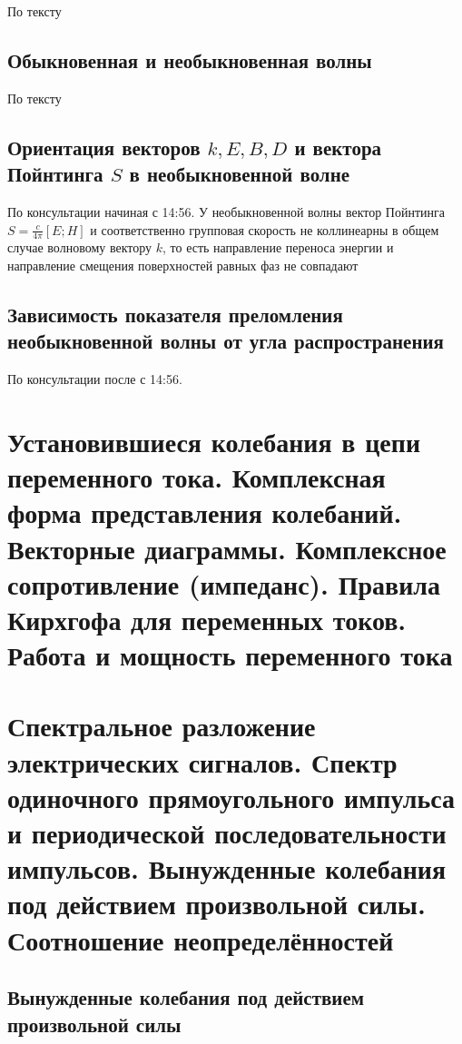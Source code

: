 \documentclass[a4paper, 14pt]{article}
\begin{document}
    По тексту
    
    \subsection{Обыкновенная и необыкновенная волны}
    
    По тексту
    
    \subsection{Ориентация векторов $k, E, B, D$ и вектора Пойнтинга $S$ в необыкновенной волне}
    
    По консультации начиная с 14:56.
    У необыкновенной волны вектор Пойнтинга $S = \frac{c}{4 \pi} [E;H]$ и соответственно групповая скорость не
    коллинеарны в общем случае волновому вектору $k$, то есть направление переноса энергии и направление смещения
    поверхностей равных фаз не совпадают
    
    \subsection{Зависимость показателя преломления необыкновенной волны от угла распространения}
    
    По консультации после с 14:56.
    
    \section{Установившиеся колебания в цепи переменного тока.
    Комплексная форма представления колебаний.
    Векторные диаграммы.
    Комплексное сопротивление (импеданс).
    Правила Кирхгофа для переменных токов.
    Работа и мощность переменного тока}
    
    \section{Спектральное разложение электрических сигналов.
    Спектр одиночного прямоугольного импульса и периодической последовательности импульсов.
    Вынужденные колебания под действием произвольной силы.
    Соотношение неопределённостей}
    
    \subsection{Вынужденные колебания под действием произвольной силы}
    
\end{document}
